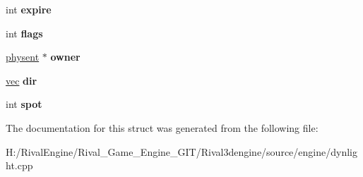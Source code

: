\begin{DoxyCompactItemize}
int {\bfseries expire}
\item 
\mbox{\label{structdynlight_af87f9b9b13b59e73ec605e5f507bf8e8}} 
int {\bfseries flags}
\item 
\mbox{\label{structdynlight_ac7d520548d1d9ec667859ccb9f3aa75a}} 
\hyperlink{structphysent}{physent} $\ast$ {\bfseries owner}
\item 
\mbox{\label{structdynlight_a99a26e2fc3ba427615cf7c1c5a186d2a}} 
\hyperlink{structvec}{vec} {\bfseries dir}
\item 
\mbox{\label{structdynlight_ad09b70b225c9836e55a03e7c85bd043e}} 
int {\bfseries spot}
\end{DoxyCompactItemize}


The documentation for this struct was generated from the following file\+:\begin{DoxyCompactItemize}
\item 
H\+:/\+Rival\+Engine/\+Rival\+\_\+\+Game\+\_\+\+Engine\+\_\+\+G\+I\+T/\+Rival3dengine/source/engine/dynlight.\+cpp\end{DoxyCompactItemize}

